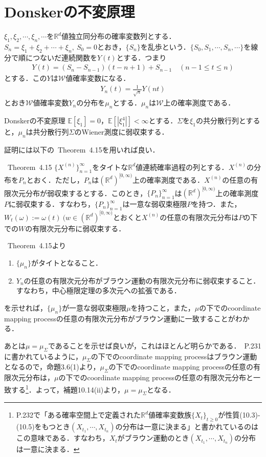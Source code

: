 \documentclass[dvipdfmx]{jsarticle}
\begin{document}
\section{Donskerの不変原理}
$\xi_1,\xi_2,\cdots,\xi_n,\cdots$を$\mathbb{R}^d$値独立同分布の確率変数列とする．$S_n=\xi_1+\xi_2+\cdots+\xi_n,{\ }S_0=0$とおき，$\{S_n\}$を乱歩という．$\{S_0,S_1,\cdots,S_n,\cdots\}$を線分で順につないだ連続関数を$Y(t)$とする．つまり
\begin{align*}
Y(t)=(S_n-S_{n-1})(t-n+1)+S_{n-1} \quad (n-1\leq t\leq n)
\end{align*}
とする．この$Y$は$\mathcal{W}$値確率変数になる．
\begin{align*}
Y_n(t)=\frac{1}{\sqrt{n}}Y(nt)
\end{align*}
とおき$\mathcal{W}$値確率変数$Y_n$の分布を$\mu_n$とする．$\mu_n$は$\mathcal{W}$上の確率測度である．
\begin{itembox}[l]{Donskerの不変原理}
$\mathbb{E}[\xi_1]=0$，$\mathbb{E}[|\xi_1^4|]<\infty$とする．$\Sigma$を$\xi_1$の共分散行列とすると，$\mu_n$は共分散行列$\Sigma$のWiener測度に弱収束する．
\end{itembox}
証明には以下の\cite{KS}{\ }Theorem{\ }4.15を用いれば良い．
\begin{itembox}[l]{\cite{KS}{\ }Theorem{\ }4.15}
$\{X^{(n)}\}_{n=1}^\infty$をタイトな$\mathbb{R}^d$値連続確率過程の列とする．$X^{(n)}$の分布を$P_n$とおく．ただし，$P_n$は$(\mathbb{R}^d)^{[0,\infty)}$上の確率測度である．$X^{(n)}$の任意の有限次元分布が弱収束するとする．このとき，$\{P_n\}_{n=1}^\infty$は$(\mathbb{R}^d)^{[0,\infty)}$上の確率測度$P$に弱収束する．すなわち，$\{P_n\}_{n=1}^\infty$は一意な弱収束極限$P$を持つ．また，$W_t(\omega):=\omega(t){\ }(w\in(\mathbb{R}^d)^{[0,\infty)}$とおくと$X^{(n)}$の任意の有限次元分布は$P$の下での$W$の有限次元分布に弱収束する．
\end{itembox}
\cite{KS}{\ }Theorem{\ }4.15より
\begin{enumerate}
\renewcommand{\labelenumi}{(\arabic{enumi})}
\item $\{\mu_n\}$がタイトとなること．
\item $Y_n$の任意の有限次元分布がブラウン運動の有限次元分布に弱収束すること．すなわち，中心極限定理の多次元への拡張である．
\end{enumerate}
を示せれば，$\{\mu_n\}$が一意な弱収束極限$\mu$を持つこと，また，$\mu$の下でのcoordinate mapping processの任意の有限次元分布がブラウン運動に一致することがわかる．\par
あとは$\mu=\mu_\Sigma$であることを示せば良いが，これはほとんど明らかである．\cite{kotani}{\ }P.231に書かれているように，$\mu_{\Sigma}$の下でのcoordinate mapping processはブラウン運動となるので，\cite{taniguchi}命題3.6(1)より，$\mu_\Sigma$の下でのcoordinate mapping processの任意の有限次元分布は，$\mu$の下でのcoordinate mapping processの任意の有限次元分布と一致する\footnote{\cite{kotani}P.232で「ある確率空間上で定義された$\mathbb{R}^d$値確率変数族$\{X_t\}_{t\geq 0}$が性質(10.3)-(10.5)をもつとき$(X_{t_1},\cdots,X_{t_n})$の分布は一意に決まる」と書かれているのはこの意味である．すなわち，$X_t$がブラウン運動のとき$(X_{t_1},\cdots,X_{t_n})$の分布は一意に決まる．}．よって，\cite{kotani}補題10.14(ii)より，$\mu=\mu_{\Sigma}$となる．
\end{document}

